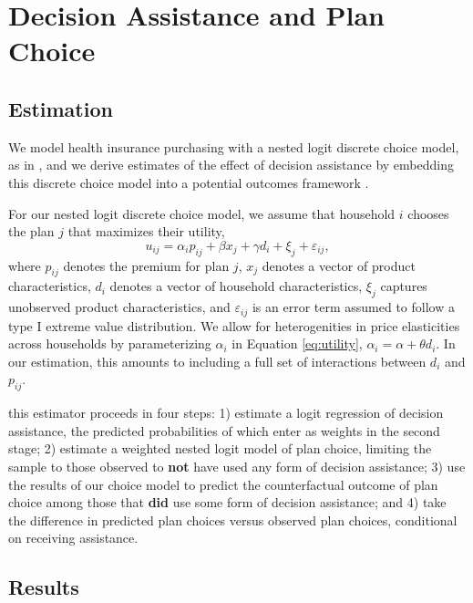 \documentclass[12pt]{article}
\begin{document}
\section{Decision Assistance and Plan Choice}
\label{sec:causal}

\subsection{Estimation}
\label{subsec:causal-methods}
We model health insurance purchasing with a nested logit discrete choice model, as in \cite{saltzman2019}, and we derive estimates of the effect of decision assistance by embedding this discrete choice model into a potential outcomes framework \citep{rubin1974, imbens2009}.

For our nested logit discrete choice model, we assume that household $i$ chooses the plan $j$ that maximizes their utility,
\begin{equation}
u_{ij} = \alpha_{i}p_{ij} + \beta x_{j} + \gamma d_{i} + \xi_{j} + \varepsilon_{ij}, \label{eq:utility}
\end{equation}
where $p_{ij}$ denotes the premium for plan $j$, $x_{j}$ denotes a vector of product characteristics, $d_{i}$ denotes a vector of household characteristics, $\xi_{j}$ captures unobserved product characteristics, and $\varepsilon_{ij}$ is an error term assumed to follow a type I extreme value distribution. We allow for heterogenities in price elasticities across households by parameterizing $\alpha_{i}$ in Equation \eqref{eq:utility}, $\alpha_{i} = \alpha + \theta d_{i}.$ In our estimation, this amounts to including a full set of interactions between $d_{i}$ and $p_{ij}$.

this estimator proceeds in four steps: 1) estimate a logit regression of decision assistance, the predicted probabilities of which enter as weights in the second stage; 2) estimate a weighted nested logit model of plan choice, limiting the sample to those observed to \textbf{not} have used any form of decision assistance; 3) use the results of our choice model to predict the counterfactual outcome of plan choice among those that \textbf{did} use some form of decision assistance; and 4) take the difference in predicted plan choices versus observed plan choices, conditional on receiving assistance. 

\subsection{Results}
\label{subsec:causal-results}
\end{document}
